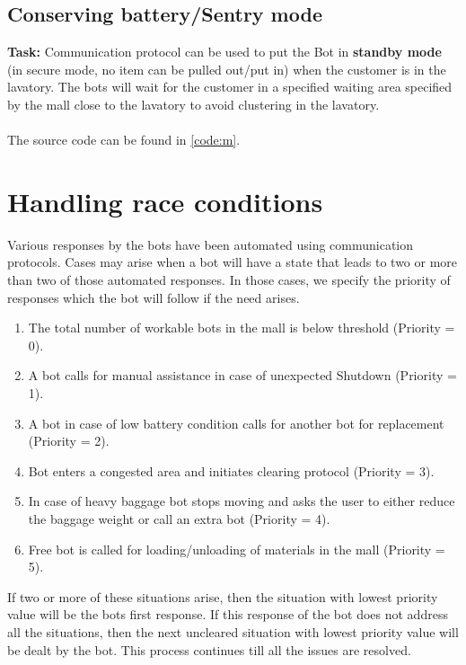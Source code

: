 \documentclass{article}
\begin{document}
\subsection{Conserving battery/Sentry mode}
\textbf{Task: } Communication protocol can be used to put the Bot in \textbf{standby mode} (in secure mode, no item can be pulled out/put in) when the customer is in the lavatory. The bots will wait for the customer in a specified waiting area specified by the mall close to the lavatory to avoid clustering in the lavatory.
\\
\\
The source code can be found in \ref{code:m}.
\section{Handling race conditions}
Various responses by the bots have been automated using communication protocols. Cases may arise when a bot will have a state that leads to two or more than two of those automated responses. In those cases, we specify the priority of responses which the bot will follow if the need arises.
\begin{enumerate}
    \item The total number of workable bots in the mall is below threshold (Priority = 0).
    \item A bot calls for manual assistance in case of unexpected Shutdown (Priority = 1).
    \item A bot in case of low battery condition calls for another bot for replacement (Priority = 2).
    \item  Bot enters a congested area and initiates clearing protocol (Priority = 3).
    \item In case of heavy baggage bot stops moving and asks the user to either reduce the baggage weight or call an extra bot (Priority = 4).
    \item Free bot is called for loading/unloading of materials in the mall (Priority = 5).
\end{enumerate}
If two or more of these situations arise, then the situation with lowest priority value will be the bots first response.
If this response of the bot does not address all the situations, then the next uncleared situation with lowest priority value will be dealt by the bot. This process continues till all the issues are resolved.
\end{document}
